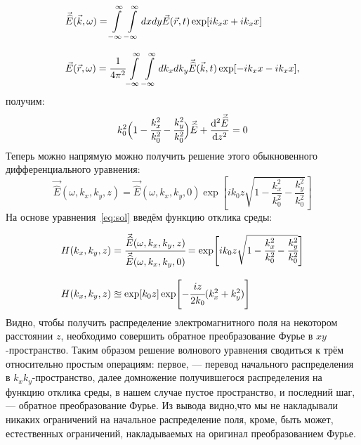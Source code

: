 \begin{equation}
	\label{eq:Fourier_rk}
	\begin{array}{lcl}
		\vec{\widehat{E}}(\vec{k}, \omega) = \displaystyle\int\limits_{-\infty}^{\infty}\int\limits_{-\infty}^{\infty} dxdy \vec{E}(\vec{r}, t)\exp[ik_xx + ik_xx]\\
		\\
		\vec{E}(\vec{r}, \omega) = \cfrac{1}{4\pi^2}\displaystyle\int\limits_{-\infty}^{\infty}\int\limits_{-\infty}^{\infty} dk_xdk_y \vec{\widehat{E}}(\vec{k}, t)\exp[-ik_xx - ik_xx],
	\end{array}
\end{equation}
получим: 
\begin{equation}
	k_0^2\Big(1 - \cfrac{k^2_x}{k^2_0} - \cfrac{k^2_y}{k^2_0} \Big)\vec{\widehat{E}} + \dv[2]{\vec{\widehat{E}}}{z} = 0
\end{equation}
Теперь можно напрямую можно получить решение этого обыкновенного дифференциального уравнения:
\begin{equation}
	\label{eq:sol}
	\vec{\widehat{E}}(\omega, k_x, k_y, z) = \vec{\widehat{E}}(\omega, k_x, k_y, 0)\exp[ik_0z\sqrt{1 - \frac{k^2_x}{k^2_0} - \frac{k^2_y}{k^2_0}} ]
\end{equation}
На основе уравнения~\ref{eq:sol} введём функцию отклика среды:

\begin{equation}
	\begin{array}{lcl}
	H(k_x, k_y, z) = \cfrac{\vec{\widehat{E}}(\omega, k_x, k_y, z)}{\vec{\widehat{E}}(\omega, k_x, k_y, 0)} = \exp[ik_0z\sqrt{1 - \cfrac{k^2_x}{k^2_0} - \cfrac{k^2_y}{k^2_0}} ]
	\\
	\\
	H(k_x, k_y, z) \approxeq \exp[k_0z]\exp[-\cfrac{iz}{2k_0}(k^2_x + k^2_y)]
	\end{array}
\end{equation}
Видно, чтобы получить распределение электромагнитного поля на некотором расстоянии $z$, необходимо совершить обратное преобразование Фурье в $xy$-пространство. Таким образом решение волнового уравнения сводиться к трём относительно простым операциям: первое, --- перевод начального распределения в $k_xk_y$-пространство, далее домножение получившегося распределения на функцию отклика среды, в нашем случае пустое пространство, и последний шаг, --- обратное преобразование Фурье. Из вывода видно,что мы не накладывали никаких ограничений на начальное распределение поля, кроме, быть может, естественных ограничений, накладываемых на оригинал преобразованием Фурье.

